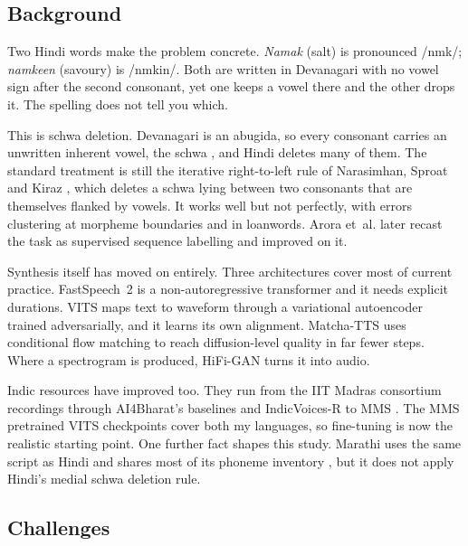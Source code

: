 \documentclass[12pt,a4paper]{article}
\makeatletter
\newcommand{\ipaschwa}{\textipa{@}}
\newcommand{\ipalong}{\textipa{:}}
\newcommand{\ipaA}[1]{/#1/}
\newcommand{\ipaschwa}{\symbol{"0259}}
\newcommand{\ipalong}{\symbol{"02D0}}
\newcommand{\ipaA}[1]{/#1/}
\makeatother
\begin{document}
\subsection{Background}

Two Hindi words make the problem concrete. \textit{Namak} (salt) is pronounced
\ipaA{n\ipaschwa m\ipaschwa k}; \textit{namkeen} (savoury) is
\ipaA{n\ipaschwa mki\ipalong n}. Both are written in Devanagari with no vowel
sign after the second consonant, yet one keeps a vowel there and the other
drops it. The spelling does not tell you which.

This is schwa deletion. Devanagari is an abugida, so every consonant carries an
unwritten inherent vowel, the schwa \ipaschwa, and Hindi deletes many of them.
The standard treatment is still the iterative right-to-left rule of Narasimhan,
Sproat and Kiraz \cite{narasimhan2004schwa}, which deletes a schwa lying
between two consonants that are themselves flanked by vowels. It works well but
not perfectly, with errors clustering at morpheme boundaries and in loanwords.
Arora et~al. \cite{arora2020schwa} later recast the task as supervised sequence
labelling and improved on it.

Synthesis itself has moved on entirely. Three architectures cover most of
current practice. FastSpeech~2 \cite{ren2021fastspeech2} is a
non-autoregressive transformer and it needs explicit durations. VITS
\cite{kim2021vits} maps text to waveform through a variational autoencoder
trained adversarially, and it learns its own alignment. Matcha-TTS
\cite{mehta2024matcha} uses conditional flow matching to reach
diffusion-level quality in far fewer steps. Where a spectrogram is produced,
HiFi-GAN \cite{kong2020hifigan} turns it into audio.

Indic resources have improved too. They run from the IIT Madras consortium
recordings \cite{baby2016resources} through AI4Bharat's baselines
\cite{kumar2023nextbillion} and IndicVoices-R \cite{sankar2024indicvoicesr} to
MMS \cite{pratap2024mms}. The MMS pretrained VITS checkpoints cover both my
languages, so fine-tuning is now the realistic starting point. One further fact
shapes this study. Marathi uses the same script as Hindi and shares most of its
phoneme inventory \cite{ohala1999hindi, dhongde2009marathi}, but it does not
apply Hindi's medial schwa deletion rule.

\subsection{Challenges}
\end{document}

